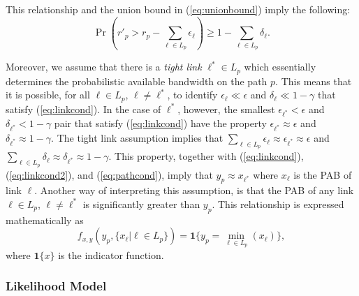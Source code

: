 \documentclass[final,5p,times,twocolumn]{elsarticle}
\begin{document}
This relationship and the union bound in (\ref{eq:unionbound}) imply the following:
\begin{equation}
\Pr\left(r'_p > r_p - \sum_{{\ell} \in L_p} \epsilon_{\ell}\right) \geq 1 - \sum_{{\ell} \in L_p} \delta_{\ell}. \label{eq:pathcond}
\end{equation}



Moreover, we assume that there is a \emph{tight link} ${\ell}^* \in L_p$ which essentially determines the probabilistic available bandwidth on the path $p$. 
This means that it is possible, for all ${\ell}\in L_p$, ${\ell} \ne {\ell}^*$, to identify $\epsilon_{\ell}\ll \epsilon$ and $\delta_{\ell}\ll 1 - \gamma$ that satisfy (\ref{eq:linkcond}). 
In the case of ${\ell}^*$, however, the smallest $\epsilon_{{\ell}^*} < \epsilon$ and $\delta_{{\ell}^*} <1 - \gamma$ pair that satisfy (\ref{eq:linkcond}) have the property $\epsilon_{{\ell}^*} \approx \epsilon$ and $\delta_{{\ell}^*} \approx 1 - \gamma$.
The tight link assumption implies that $\textstyle{\sum}_{{\ell} \in L_p} \epsilon_{\ell} \approx \epsilon_{{\ell}^*} \approx \epsilon$ and $\textstyle{\sum}_{{\ell} \in L_p} \delta_{\ell} \approx \delta_{{\ell}^*} \approx 1 - \gamma$. 
This property, together with (\ref{eq:linkcond}), (\ref{eq:linkcond2}), and (\ref{eq:pathcond}), imply that $y_p \approx x_{{\ell}^*}$ where $x_{\ell}$ is the PAB of link $\ell$. 
Another way of interpreting this assumption, is that the PAB of any link $\ell \in L_p$, $\ell \neq {\ell}^*$ is significantly greater than $y_p$. 
This relationship is expressed mathematically as $$f_{x,y} (y_p, \{x_{\ell} | \ell \in L_p\}) = \mathbf{1} \{y_p = \min_{\ell \in L_p} (x_\ell)\},$$ where $\mathbf{1}\{x\}$ is the indicator function. 

\subsubsection{Likelihood Model}
\label{sssec:likelihood}
\end{document}
